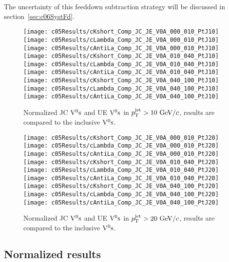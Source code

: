 The uncertainty of this feeddown subtraction strategy will be
discussed in section~\ref{sec:c06SystFd}.

\begin{figure}[htb]
\begin{center}
\texttt{[image: c05Results/cKshort\_Comp\_JC\_JE\_V0A\_000\_010\_PtJ10]}
\texttt{[image: c05Results/cLambda\_Comp\_JC\_JE\_V0A\_000\_010\_PtJ10]}
\texttt{[image: c05Results/cAntiLa\_Comp\_JC\_JE\_V0A\_000\_010\_PtJ10]}
\texttt{[image: c05Results/cKshort\_Comp\_JC\_JE\_V0A\_010\_040\_PtJ10]}
\texttt{[image: c05Results/cLambda\_Comp\_JC\_JE\_V0A\_010\_040\_PtJ10]}
\texttt{[image: c05Results/cAntiLa\_Comp\_JC\_JE\_V0A\_010\_040\_PtJ10]}
\texttt{[image: c05Results/cKshort\_Comp\_JC\_JE\_V0A\_040\_100\_PtJ10]}
\texttt{[image: c05Results/cLambda\_Comp\_JC\_JE\_V0A\_040\_100\_PtJ10]}
\texttt{[image: c05Results/cAntiLa\_Comp\_JC\_JE\_V0A\_040\_100\_PtJ10]}
\caption{Normalized JC ${\rm V}^{0}{\rm s}$ and UE ${\rm V}^{0}{\rm s}$ in $p_{\rm T}^{\rm jet}>10~{\rm GeV}/c$,
         results are compared to the inclusive ${\rm V}^{0}{\rm s}$.}
\label{fig:c05RestulsCompJCPtJ10}
\end{center}
\end{figure}

\begin{figure}[htb]
\begin{center}
\texttt{[image: c05Results/cKshort\_Comp\_JC\_JE\_V0A\_000\_010\_PtJ20]}
\texttt{[image: c05Results/cLambda\_Comp\_JC\_JE\_V0A\_000\_010\_PtJ20]}
\texttt{[image: c05Results/cAntiLa\_Comp\_JC\_JE\_V0A\_000\_010\_PtJ20]}
\texttt{[image: c05Results/cKshort\_Comp\_JC\_JE\_V0A\_010\_040\_PtJ20]}
\texttt{[image: c05Results/cLambda\_Comp\_JC\_JE\_V0A\_010\_040\_PtJ20]}
\texttt{[image: c05Results/cAntiLa\_Comp\_JC\_JE\_V0A\_010\_040\_PtJ20]}
\texttt{[image: c05Results/cKshort\_Comp\_JC\_JE\_V0A\_040\_100\_PtJ20]}
\texttt{[image: c05Results/cLambda\_Comp\_JC\_JE\_V0A\_040\_100\_PtJ20]}
\texttt{[image: c05Results/cAntiLa\_Comp\_JC\_JE\_V0A\_040\_100\_PtJ20]}
\caption{Normalized JC ${\rm V}^{0}{\rm s}$ and UE ${\rm V}^{0}{\rm s}$ in $p_{\rm T}^{\rm jet}>20~{\rm GeV}/c$,
         results are compared to the inclusive ${\rm V}^{0}{\rm s}$.}
\label{fig:c05RestulsCompJCPtJ20}
\end{center}
\end{figure}

\subsection{Normalized results}
\label{sec:c05NormResults}

